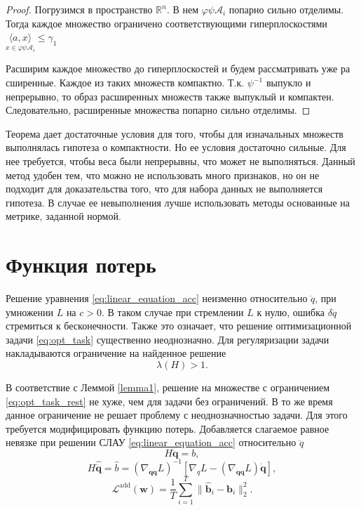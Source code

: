 \documentclass[a4paper, 12pt]{article}
\renewcommand{\phi}{\ensuremath{\varphi}}
\renewcommand{\leq}{\ensuremath{\leqslant}}
\begin{document}
\begin{proof}
Погрузимся в пространство $\mathbb{R}^{n}$. В нем $\phi\psi \mathcal{A}_{i}$ попарно сильно отделимы. Тогда каждое множество ограничено соответствующими гиперплоскостями $\underset{x \in \phi\psi\mathcal{A}_{i}}{\langle a, x \rangle}\leq \gamma_{1}$

Расширим каждое множество до гиперплоскостей и будем рассматривать уже ра
сширенные. Каждое из таких множеств компактно. Т.к. $\psi^{-1}$ выпукло и непрерывно, то образ расширенных множеств также выпуклый и компактен. Следовательно, расширенные множества попарно сильно отделимы.
\end{proof}

Теорема дает достаточные условия для того, чтобы для изначальных множеств выполнялась гипотеза о компактности. Но ее условия достаточно сильные. Для нее требуется, чтобы веса были непрерывны, что может не выполняться.  Данный метод удобен тем, что можно не использовать много признаков, но он не подходит для доказательства того, что для набора данных не выполняется гипотеза. В случае ее невыполнения лучше использовать методы основанные на метрике, заданной нормой. 

\section {Функция потерь}
Решение уравнения \eqref{eq:linear_equation_acc} неизменно относительно $\ddot{q}$, при умножении $L$ на $c > 0$. В таком случае при стремлении $L$ к нулю, ошибка $\delta\ddot{q}$ стремиться к бесконечности. Также это означает, что решение оптимизационной задачи \eqref{eq:opt_task} существенно неоднозначно. Для регуляризации задачи накладываются ограничение на найденное решение
\begin{equation}\label{eq:opt_task_rest}
    \lambda \left(H\right) > 1.
\end{equation}

В соответствие с Леммой \ref{lemma1}, решение на множестве с ограничением \eqref{eq:opt_task_rest} не хуже, чем для задачи без ограничений. В то же время данное ограничение не решает проблему с неоднозначностью задачи. Для этого требуется модифицировать функцию потерь. Добавляется слагаемое равное невязке при решении СЛАУ \eqref{eq:linear_equation_acc} относительно $\ddot{q}$
\[H\ddot{\mathbf{q}} = b,\]
 \[H\hat{\ddot{\mathbf{q}}} = \hat{b} = \left(\nabla_{\dot{\mathbf{q}} \dot{\mathbf{q}}} L\right)^{-1}\left[\nabla_{q} L-\left(\nabla_{\dot{\mathbf{q}}\mathbf{q}} L\right) \dot{\mathbf{q}}\right], \]
\begin{equation}
    \mathcal{L}^{\text{add}}(\textbf{w}) = \frac{1}{T}\sum_{i=1}^{T} \| \mathbf{\hat{b}}_i - \mathbf{b}_i \|_2^2.
\end{equation}
\end{document}
